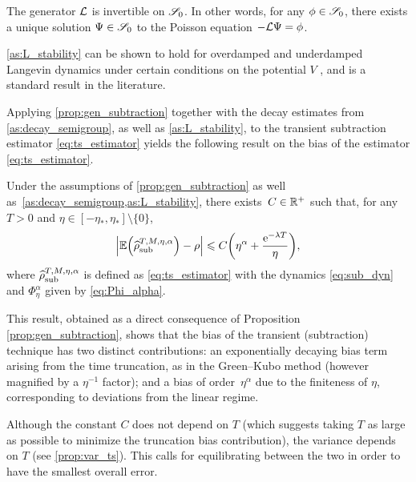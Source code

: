\begin{assumption}
\label{as:L_stability}
%
The generator $\L$ is invertible on $\S_0$. In other words, for any $\phi\in\S_0$, there exists a unique solution $\Psi \in \S_0$ to the Poisson equation $-\L\Psi = \phi$.
\end{assumption}

\cref{as:L_stability} can be shown to hold for overdamped and underdamped Langevin dynamics under certain conditions on the potential $V$ \cite{talay2002,kopec_ovd,kopec_lang}, and is a standard result in the literature.

Applying \cref{prop:gen_subtraction} together with the decay estimates from \cref{as:decay_semigroup}, as well as \cref{as:L_stability}, to the transient subtraction estimator \eqref{eq:ts_estimator} yields the following result on the bias of the estimator \eqref{eq:ts_estimator}.

\begin{corollary}
\label{cor:gk_equiv}
Under the assumptions of \cref{prop:gen_subtraction} as well as~\cref{as:decay_semigroup,as:L_stability}, there exists~$C\in\R^+$ such that, for any $T>0$ and $\eta \in [-\eta_*, \eta_*] \setminus \{0\}$,
\begin{equation}
	\left|\E\paren*{\aTSest} - \rho\right| \leq C\paren*{\eta^\alpha + \frac{\e^{-\lambda T}}{\eta}},
\label{eq:gk_cor_statement}
\end{equation}
%
where $\aTSest$ is defined as \eqref{eq:ts_estimator} with the dynamics \eqref{eq:sub_dyn} and $\Phi_\eta^\alpha$ given by \eqref{eq:Phi_alpha}.
%
\end{corollary}

This result, obtained as a direct consequence of Proposition \ref{prop:gen_subtraction}, shows that the bias of the transient (subtraction) technique has two distinct contributions: an exponentially decaying bias term arising from the time truncation, as in the Green--Kubo method (however magnified by a $\eta^{-1}$ factor); and a bias of order~$\eta^\alpha$ due to the finiteness of $\eta$, corresponding to deviations from the linear regime.

%
%
\begin{remark}
	Although the constant $C$ does not depend on $T$ (which suggests taking $T$ as large as possible to minimize the truncation bias contribution), the variance depends on $T$ (see \cref{prop:var_ts}). This calls for equilibrating between the two in order to have the smallest overall error.
\end{remark}

